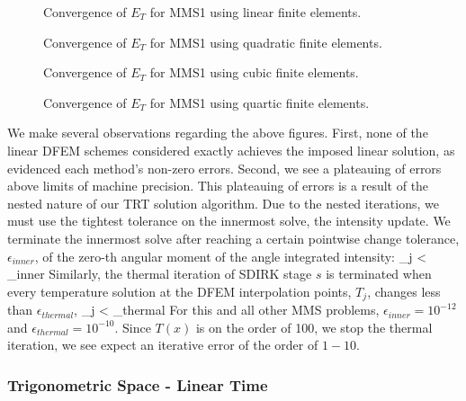 \begin{figure}[!ht]
\centering

\caption{Convergence of $E_{T}$ for MMS1 using linear finite elements.}
\label{fig:mms1_linear_temp}
\end{figure}
\begin{figure}[!ht]
\centering

\caption{Convergence of $E_{T}$ for MMS1 using quadratic finite elements.}
\label{fig:mms1_quadratic_temp}
\end{figure}
\begin{figure}[!ht]
\centering

\caption{Convergence of $E_{T}$ for MMS1 using cubic finite elements.}
\label{fig:mms1_cubic_temp}
\end{figure}
\begin{figure}[!ht]
\centering

\caption{Convergence of $E_{T}$ for MMS1 using quartic finite elements.}
\label{fig:mms1_quartic_temp}
\end{figure}

We make several observations regarding the above figures.  First, none of the linear DFEM schemes considered exactly achieves the imposed linear solution, as evidenced each method's non-zero errors.
Second, we see a plateauing of errors above limits of machine precision.
This plateauing of errors is a result of the nested nature of our TRT solution algorithm.
Due to the nested iterations, we must use the tightest tolerance on the innermost solve, the intensity update.
We terminate the innermost solve after reaching a certain pointwise change tolerance, $\epsilon_{inner}$, of the zero-th angular moment of the angle integrated intensity: 
\benum
\max_{j} {   } < \epsilon_{inner} \pep
\eenum
Similarly, the thermal iteration of SDIRK stage $s$ is terminated when every temperature solution at the DFEM interpolation points, $T_j$,  changes less than $\epsilon_{thermal}$,
\benum
 \max_{j} { {   } }< \epsilon_{thermal} \pep
\eenum
For this and all other MMS problems, $\epsilon_{inner} = 10^{-12}$ and $\epsilon_{thermal} = 10^{-10}$.
Since $T(x)$ is on the order of 100, we stop the thermal iteration, we see expect an iterative error of the order of $1-10$.



\subsubsection{Trigonometric Space - Linear Time}

